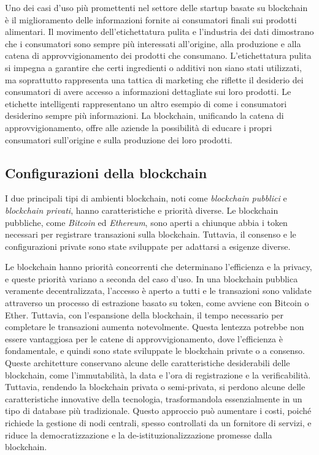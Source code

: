 Uno dei casi d'uso più promettenti nel settore delle startup basate su blockchain è il miglioramento delle informazioni fornite ai consumatori finali sui prodotti alimentari. Il movimento dell'etichettatura pulita e l'industria dei dati dimostrano che i consumatori sono sempre più interessati all'origine, alla produzione e alla catena di approvvigionamento dei prodotti che consumano. L'etichettatura pulita si impegna a garantire che certi ingredienti o additivi non siano stati utilizzati, ma soprattutto rappresenta una tattica di marketing che riflette il desiderio dei consumatori di avere accesso a informazioni dettagliate sui loro prodotti. Le etichette intelligenti rappresentano un altro esempio di come i consumatori desiderino sempre più informazioni. La blockchain, unificando la catena di approvvigionamento, offre alle aziende la possibilità di educare i propri consumatori sull'origine e sulla produzione dei loro prodotti.

\subsection{Configurazioni della blockchain}

I due principali tipi di ambienti blockchain, noti come \textit{blockchain pubblici} e \textit{blockchain privati}, hanno caratteristiche e priorità diverse. Le blockchain pubbliche, come \textit{Bitcoin} ed \textit{Ethereum}, sono aperti a chiunque abbia i token necessari per registrare transazioni sulla blockchain. Tuttavia, il consenso e le configurazioni private sono state sviluppate per adattarsi a esigenze diverse.

Le blockchain hanno priorità concorrenti che determinano l'efficienza e la privacy, e queste priorità variano a seconda del caso d'uso. In una blockchain pubblica veramente decentralizzata, l'accesso è aperto a tutti e le transazioni sono validate attraverso un processo di estrazione basato su token, come avviene con Bitcoin o Ether. Tuttavia, con l'espansione della blockchain, il tempo necessario per completare le transazioni aumenta notevolmente. Questa lentezza potrebbe non essere vantaggiosa per le catene di approvvigionamento, dove l'efficienza è fondamentale, e quindi sono state sviluppate le blockchain private o a consenso. Queste architetture conservano alcune delle caratteristiche desiderabili delle blockchain, come l'immutabilità, la data e l'ora di registrazione e la verificabilità. Tuttavia, rendendo la blockchain privata o semi-privata, si perdono alcune delle caratteristiche innovative della tecnologia, trasformandola essenzialmente in un tipo di database più tradizionale. Questo approccio può aumentare i costi, poiché richiede la gestione di nodi centrali, spesso controllati da un fornitore di servizi, e riduce la democratizzazione e la de-istituzionalizzazione promesse dalla blockchain.

